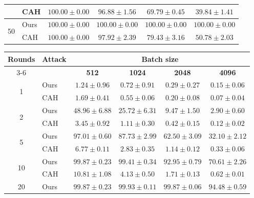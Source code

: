 \begin{table}[t]
\begin{tabular}{@{}clcccc@{}}
        & CAH  & $\mathbf{100.00} \pm 0.00$ & $96.88 \pm 1.56$ & $69.79 \pm 0.45$ & $39.84 \pm 1.41$ \\
        \midrule
        \multirow{2}{*}{50}
        & Ours & $\mathbf{100.00} \pm 0.00$ & $\mathbf{100.00} \pm 0.00$ & $\mathbf{100.00} \pm 0.00$ & $\mathbf{100.00} \pm 0.00$ \\
        & CAH  & $\mathbf{100.00} \pm 0.00$ & $97.92 \pm 2.39$ & $79.43 \pm 3.16$ & $50.78 \pm 2.03$ \\
        \bottomrule
    \end{tabular}

    \vspace{0.8em}

    \begin{tabular}{@{}clcccc@{}}
        \toprule
        \textbf{Rounds} & \textbf{Attack} & \multicolumn{4}{c}{\textbf{Batch size}} \\
        \cmidrule(l){3-6}
        & & \textbf{512} & \textbf{1024} & \textbf{2048} & \textbf{4096} \\
        \midrule
        \multirow{2}{*}{1}
        & Ours & $1.24 \pm 0.96$ & $\mathbf{0.72} \pm 0.91$ & $\mathbf{0.29} \pm 0.27$ & $\mathbf{0.15} \pm 0.06$ \\
        & CAH  & $\mathbf{1.69} \pm 0.41$ & $0.55 \pm 0.06$ & $0.20 \pm 0.08$ & $0.07 \pm 0.04$ \\
        \midrule
        \multirow{2}{*}{2}
        & Ours & $\mathbf{48.96} \pm 6.88$ & $\mathbf{25.72} \pm 6.31$ & $\mathbf{9.47} \pm 1.50$ & $\mathbf{2.90} \pm 0.60$ \\
        & CAH  & $3.45 \pm 0.92$ & $1.11 \pm 0.30$ & $0.42 \pm 0.15$ & $0.12 \pm 0.02$ \\
        \midrule
        \multirow{2}{*}{5}
        & Ours & $\mathbf{97.01} \pm 0.60$ & $\mathbf{87.73} \pm 2.99$ & $\mathbf{62.50} \pm 3.09$ & $\mathbf{32.10} \pm 2.12$ \\
        & CAH  & $6.77 \pm 0.11$ & $2.83 \pm 0.35$ & $1.14 \pm 0.12$ & $0.33 \pm 0.06$ \\
        \midrule
        \multirow{2}{*}{10}
        & Ours & $\mathbf{99.87} \pm 0.23$ & $\mathbf{99.41} \pm 0.34$ & $\mathbf{92.95} \pm 0.79$ & $\mathbf{70.61} \pm 2.26$ \\
        & CAH  & $10.81 \pm 1.08$ & $4.13 \pm 0.50$ & $1.71 \pm 0.13$ & $0.62 \pm 0.01$ \\
        \midrule
        \multirow{2}{*}{20}
        & Ours & $\mathbf{99.87} \pm 0.23$ & $\mathbf{99.93} \pm 0.11$ & $\mathbf{99.87} \pm 0.06$ & $\mathbf{94.48} \pm 0.59$ \\

\end{tabular}
\end{table}
